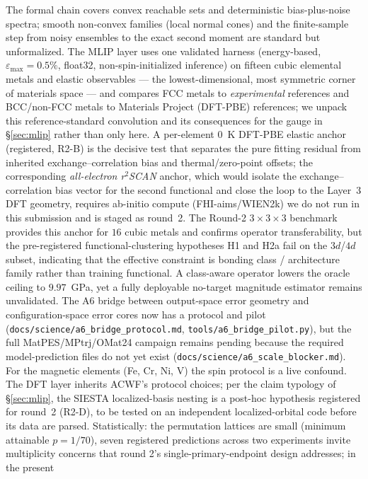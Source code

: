 \documentclass[11pt]{article}
\theoremstyle{remark}
\begin{document}
The formal chain covers convex reachable sets and deterministic
bias-plus-noise spectra; smooth non-convex families (local normal cones) and
the finite-sample step from noisy ensembles to the exact second moment are
standard but unformalized. The MLIP layer uses one validated harness
(energy-based, $\varepsilon_{\max}=0.5\%$, float32, non-spin-initialized
inference) on fifteen cubic elemental metals and elastic observables --- the
lowest-dimensional, most symmetric corner of materials space --- and compares
FCC metals to \emph{experimental} references and BCC/non-FCC metals to
Materials Project (DFT-PBE) references; we unpack this reference-standard
convolution and its consequences for the gauge in \S\ref{sec:mlip} rather than
only here. A per-element 0~K DFT-PBE elastic anchor (registered, R2-B) is the
decisive test that separates the pure fitting residual from inherited
exchange--correlation bias and thermal/zero-point offsets; the corresponding
\emph{all-electron r$^2$SCAN} anchor, which would isolate the
exchange--correlation bias vector for the second functional and close the loop
to the Layer~3 DFT geometry, requires ab-initio compute (FHI-aims/WIEN2k) we do
not run in this submission and is staged as round~2. The Round-2
$3{\times}3{\times}3$ benchmark provides this anchor for $16$ cubic metals and
confirms operator transferability, but the pre-registered functional-clustering
hypotheses H1 and H2a fail on the $3d$/$4d$ subset, indicating that the
effective constraint is bonding class / architecture family rather than training
functional. A class-aware operator lowers the oracle ceiling to $9.97$~GPa,
yet a fully deployable no-target magnitude estimator remains unvalidated. The
A6 bridge between output-space error geometry and configuration-space error
cores now has a protocol and pilot
(\texttt{docs/science/a6\_bridge\_protocol.md}, \texttt{tools/a6\_bridge\_pilot.py}),
but the full MatPES/MPtrj/OMat24 campaign remains pending because the required
model-prediction files do not yet exist
(\texttt{docs/science/a6\_scale\_blocker.md}). For the magnetic
elements (Fe, Cr, Ni, V) the spin protocol is a live confound. The DFT layer inherits
ACWF's protocol choices; per the claim typology of \S\ref{sec:mlip}, the SIESTA
localized-basis nesting is a post-hoc hypothesis registered for round~2 (R2-D),
to be tested on an independent localized-orbital code before its data are parsed. Statistically:
the permutation lattices are small (minimum attainable $p = 1/70$), seven
registered predictions across two experiments invite multiplicity concerns
that round 2's single-primary-endpoint design addresses; in the present
\end{document}
